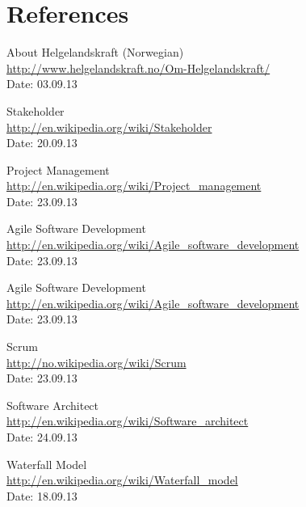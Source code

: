 \chapter{References}

\begin{thebibliography}{99}


	About Helgelandskraft (Norwegian) \\
	\href {http://www.helgelandskraft.no/Om-Helgelandskraft/}{http://www.helgelandskraft.no/Om-Helgelandskraft/} \\
	Date: 03.09.13

	Stakeholder \\
	\href{http://en.wikipedia.org/wiki/Stakeholder}{http://en.wikipedia.org/wiki/Stakeholder} \\
	Date: 20.09.13

	Project Management \\
	\href{http://en.wikipedia.org/wiki/Project_management}{http://en.wikipedia.org/wiki/Project\_management} \\
	Date: 23.09.13

	Agile Software Development \\
	\href{http://en.wikipedia.org/wiki/Agile_software_development}{http://en.wikipedia.org/wiki/Agile\_software\_development} \\
	Date: 23.09.13

	Agile Software Development \\
	\href {http://en.wikipedia.org/wiki/Agile_software_development}{http://en.wikipedia.org/wiki/Agile\_software\_development} \\
	Date: 23.09.13

	Scrum \\ 
	\href{http://no.wikipedia.org/wiki/Scrum}{http://no.wikipedia.org/wiki/Scrum} \\
	Date: 23.09.13

	Software Architect \\
	\href{http://en.wikipedia.org/wiki/Software_architect}{http://en.wikipedia.org/wiki/Software\_architect} \\
	Date: 24.09.13

	Waterfall Model \\
	\href {http://en.wikipedia.org/wiki/Waterfall_model}{http://en.wikipedia.org/wiki/Waterfall\_model} \\
	Date: 18.09.13


\end{thebibliography}
